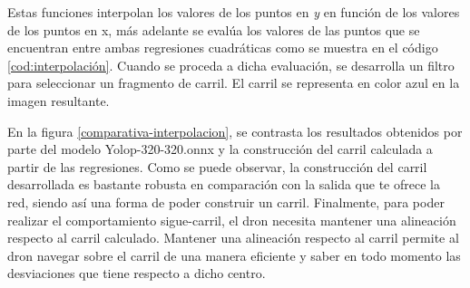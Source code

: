 Estas funciones interpolan los valores de los puntos en \textit{y} en función de los valores de los puntos en x, 
más adelante se evalúa los valores de las puntos que se encuentran entre 
ambas regresiones cuadráticas como se muestra en el código \ref{cod:interpolación}. Cuando se proceda a dicha evaluación, se desarrolla un filtro 
para seleccionar un fragmento de carril. El carril se representa en color azul en la imagen resultante.\newline

En la figura \ref{comparativa-interpolacion}, se contrasta los resultados obtenidos por parte del modelo Yolop-320-320.onnx y la construcción del carril calculada a partir de las regresiones. 
Como se puede observar, la construcción del carril desarrollada es bastante robusta en comparación con la salida que te ofrece la red, siendo así una forma de poder construir un 
carril. Finalmente, para poder realizar el comportamiento sigue-carril, el dron necesita mantener una alineación respecto al carril calculado. Mantener una alineación respecto al carril permite
al dron navegar sobre el carril de una manera eficiente y saber en todo momento las desviaciones que tiene respecto a dicho centro. \newline



